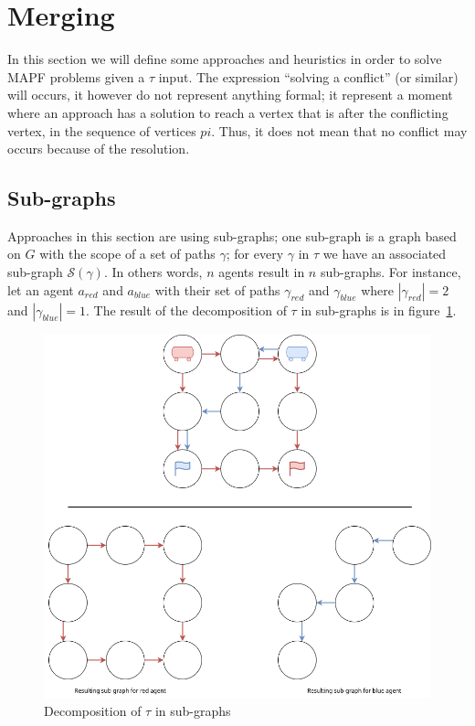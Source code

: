 
\section{Merging}\label{sec:merging}
In this section we will define some approaches and heuristics in order to solve MAPF problems given a \(\tau\) input. The expression ``solving a conflict'' (or similar) will occurs, it however do not represent anything formal; it represent a moment where an approach has a solution to reach a vertex that is after the conflicting vertex, in the sequence of vertices \(pi\). Thus, it does not mean that no conflict may occurs because of the resolution.




\subsection{Sub-graphs}\label{sec:subgraphs}
Approaches in this section are using sub-graphs; one sub-graph is a graph based on \(G\) with the scope of a set of paths \(\gamma\); for every \(\gamma\) in \(\tau\) we have an associated sub-graph \(\mathcal{S}(\gamma)\). In others words, \(n\) agents result in \(n\) sub-graphs. For instance, let an agent \(a_{red}\) and \(a_{blue}\) with their set of paths \(\gamma_{red}\) and \(\gamma_{blue}\) where \(|\gamma_{red}| = 2\) and \(|\gamma_{blue}| = 1\). The result of the decomposition of \(\tau\) in sub-graphs is in figure~\ref{img:from_graph}. 

\begin{figure}[H]
  \centering
  \caption{Decomposition of \(\tau\) in sub-graphs }\label{img:from_graph}
  \includegraphics[width=\widthimg]{img/from_graph_to_subgraph.drawio.png}
\end{figure}


